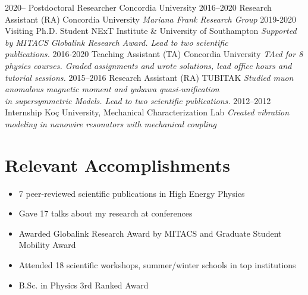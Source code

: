 \documentclass[]{friggeri-cv}
\begin{document}
\begin{entrylist}
    \entry
	{2020--}
	{Postdoctoral Researcher}
	{Concordia University}
	{\emph{}}
    \entry
	{2016--2020}
	{Research Assistant (RA)}
	{Concordia University}
	{\emph{Mariana Frank Research Group}}	
	 \entry
    {2019-2020}
    {Visiting Ph.D. Student}
    {NExT Institute \& University of Southampton}
    {\emph {Supported by MITACS Globalink Research Award. Lead to two scientific \\ publications.}}
    \entry
    {2016-2020}
    {Teaching Assistant (TA)}
    {Concordia University}
    {\emph{
    		TAed for 8 physics courses. Graded assignments and wrote solutions, lead office hours and tutorial sessions.
	}}
    \entry
    {2015--2016}
    {Research Assistant (RA)}
    {TUBITAK}
    {\emph{Studied muon anomalous magnetic moment and yukawa quasi-unification \\ in supersymmetric Models. Lead to two scientific publications.}}  
    \entry
  	{2012--2012}
  	{Internship}
  	{Koç University, Mechanical Characterization Lab}
  	{\emph{Created vibration modeling in nanowire resonators with mechanical coupling}}  
\end{entrylist}


\section{Relevant  Accomplishments}

\begin{itemize}[topsep=0pt, partopsep=0pt]
		\item 7 peer-reviewed scientific publications in High Energy Physics 
		\item Gave 17 talks about my research at conferences
	    \item Awarded Globalink Research Award by MITACS and Graduate Student Mobility Award
		\item Attended 18 scientific workshops, summer/winter schools in top institutions	   
	    \item B.Sc. in Physics 3rd Ranked Award		 
\end{itemize}
\end{document}
